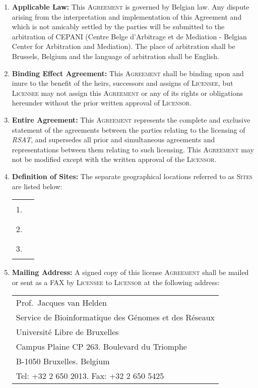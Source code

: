\documentclass[12pt]{article}
\newcommand{\RSAT}[0]{\emph{RSAT}\xspace}
\newcommand{\Licensor}[0]{\textsc{Licensor}\xspace}
\newcommand{\Licensee}[0]{\textsc{Licensee}\xspace}
\newcommand{\Agreement}[0]{\textsc{Agreement}\xspace}
\newcommand{\Sites}[0]{\textsc{Sites}\xspace}
\newcommand{\Fillline}[0]{\rule{10cm}{1pt}}
\newcommand{\Paragraph}[2]{\item \textbf{#1:} #2}
\begin{document}
\begin{enumerate}
\Paragraph{Applicable Law}{This \Agreement is governed by Belgian law. Any
dispute arising from the interpretation and implementation of this
Agreement and which is not amicably settled by the parties will be
submitted to the arbitration of CEPANI (Centre Belge d'Arbitrage et de
Mediation - Belgian Center for Arbitration and Mediation). The place
of arbitration shall be Brussels, Belgium and the language of
arbitration shall be English.

}

\Paragraph{Binding Effect Agreement}{This \Agreement shall be binding 
upon and inure to the benefit of the heirs, successors and assigns of 
\Licensee, but \Licensee may not assign this \Agreement or any of its 
rights or obligations hereunder without the prior written approval of 
\Licensor.
}

\Paragraph{Entire Agreement}{This \Agreement represents the complete 
and exclusive statement of the agreements between the parties 
relating to the licensing of \RSAT, and supersedes all 
prior and simultaneous agreements and representations between them 
relating to such licensing. This \Agreement may not be modified except 
with the written approval of the \Licensor.
}

\Paragraph{Definition of Sites}{
The separate geographical locations 
referred to as \Sites are listed below:

\begin{center}
\begin{tabular}{ll}
1.&\Fillline\\[5mm]
2.&\Fillline\\[5mm]
3.&\Fillline
\end{tabular}
\end{center}
}
\label{DefSites}


\Paragraph{Mailing Address}{A signed copy of this license \Agreement
shall be mailed or sent as a FAX by \Licensee to \Licensor at the 
following address:

\begin{tabular}{@{}l}
Prof.\ Jacques van Helden\\
Service de Bioinformatique des G\'enomes et des R\'eseaux \\
Universit\'e Libre de Bruxelles\\
Campus Plaine CP 263. Boulevard du Triomphe\\
B-1050 Bruxelles. Belgium\\
Tel: +32 2 650 2013. Fax: +32 2 650 5425\\
\end{tabular}

}
\end{enumerate}
\end{document}
